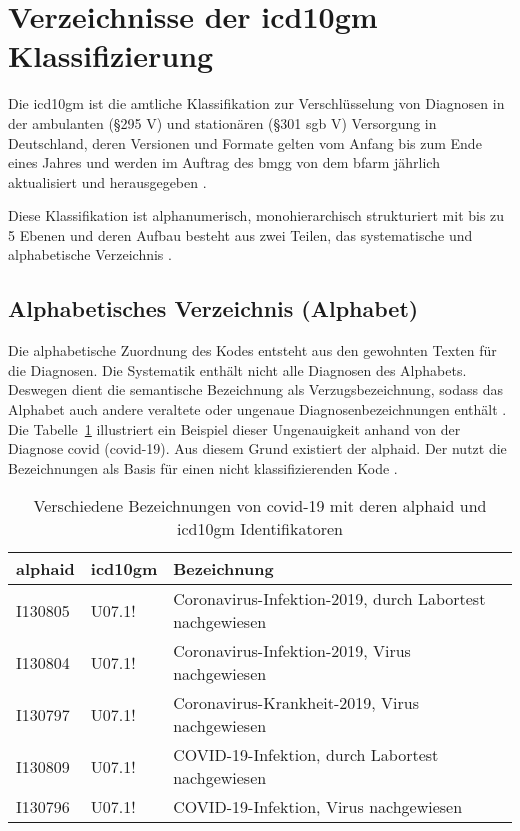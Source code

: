 \section{Verzeichnisse der \acs{icd10gm} Klassifizierung} \label{sec:difclass}

Die \ac{icd10gm} ist die amtliche Klassifikation zur Verschlüsselung von Diagnosen in der ambulanten (\S 295  V) und stationären (\S 301 \ac{sgb} V) Versorgung in Deutschland, deren Versionen und Formate gelten vom Anfang bis zum Ende eines Jahres und werden im Auftrag des \ac{bmgg} von dem \ac{bfarm} jährlich aktualisiert und herausgegeben \cite{icd10}. 

Diese Klassifikation ist alphanumerisch, monohierarchisch strukturiert mit bis zu 5 Ebenen und deren Aufbau besteht aus zwei Teilen, das systematische und alphabetische Verzeichnis \cite{icd10}.

\subsection{Alphabetisches Verzeichnis (Alphabet)} \label{subsec:alphabetic}

Die alphabetische Zuordnung des Kodes entsteht aus den gewohnten Texten für die Diagnosen. Die Systematik enthält nicht alle Diagnosen des Alphabets. Deswegen dient die semantische Bezeichnung als Verzugsbezeichnung, sodass das Alphabet auch andere veraltete oder ungenaue Diagnosenbezeichnungen enthält \cite{icd10alpha}. Die Tabelle~\ref{tab:difbe} illustriert ein Beispiel dieser Ungenauigkeit anhand von der Diagnose \acl{covid} (\acs{covid}-19). Aus diesem Grund existiert der \ac{alphaid}. Der nutzt die Bezeichnungen als Basis für einen nicht klassifizierenden Kode \cite{icd10alpha}.

\begin{table}[ht]
	\centering
	\small
	\caption[Verschiedene Bezeichnungen von COVID-19]{Verschiedene Bezeichnungen von \ac{covid}-19 mit deren \ac{alphaid} und \ac{icd10gm} Identifikatoren}
	\label{tab:difbe}
	\begin{tabular}{|l|l|l|}
		\hline
		\rowcolor{lightgray} \ac{alphaid} & \ac{icd10gm} & Bezeichnung \\
		\hline
		I130805 & U07.1! & Coronavirus-Infektion-2019, durch Labortest nachgewiesen \\ \hline
		I130804 & U07.1! & Coronavirus-Infektion-2019, Virus nachgewiesen \\ \hline
		I130797 & U07.1! & Coronavirus-Krankheit-2019, Virus nachgewiesen \\ \hline
		I130809 & U07.1! & COVID-19-Infektion, durch Labortest nachgewiesen \\ \hline
		I130796 & U07.1! & COVID-19-Infektion, Virus nachgewiesen \\ \hline				
	\end{tabular}
\end{table}

